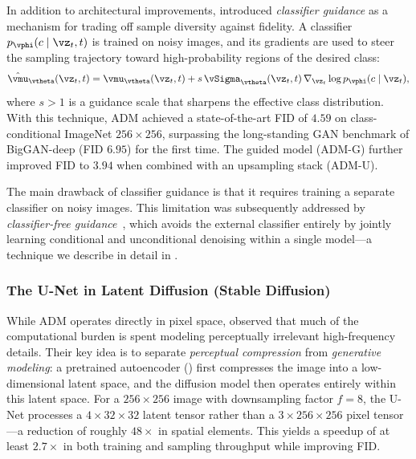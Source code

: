 \documentclass[../../book-main.tex]{subfiles}
\begin{document}
In addition to architectural improvements, \citet{dhariwal2021diffusion} introduced \textit{classifier guidance} as a mechanism for trading off sample diversity against fidelity.
A classifier \(p_{\vphi}(c \mid \vz_t, t)\) is trained on noisy images, and its gradients are used to steer the sampling trajectory toward high-probability regions of the desired class:
\begin{equation}
    \hat{\vmu}_{\vtheta}(\vz_t, t) = \vmu_{\vtheta}(\vz_t, t) + s \, \vSigma_{\vtheta}(\vz_t, t) \, \nabla_{\vz_t} \log p_{\vphi}(c \mid \vz_t) ,
\end{equation}
where \(s > 1\) is a guidance scale that sharpens the effective class distribution.
With this technique, ADM achieved a state-of-the-art FID of \(4.59\) on class-conditional ImageNet \(256 \times 256\), surpassing the long-standing GAN benchmark of BigGAN-deep (FID \(6.95\)) for the first time.
The guided model (ADM-G) further improved FID to \(3.94\) when combined with an upsampling stack (ADM-U).

The main drawback of classifier guidance is that it requires training a separate classifier on noisy images.
This limitation was subsequently addressed by \textit{classifier-free guidance}~\citep{ho2022classifier}, which avoids the external classifier entirely by jointly learning conditional and unconditional denoising within a single model---a technique we describe in detail in .

\subsubsection{The U-Net in Latent Diffusion (Stable Diffusion)}
\label{sec:unet-ldm}

While ADM operates directly in pixel space, \citet{rombach2022high} observed that much of the computational burden is spent modeling perceptually irrelevant high-frequency details.
Their key idea is to separate \textit{perceptual compression} from \textit{generative modeling}: a pretrained autoencoder () first compresses the image into a low-dimensional latent space, and the diffusion model then operates entirely within this latent space.
For a \(256 \times 256\) image with downsampling factor \(f = 8\), the U-Net processes a \(4 \times 32 \times 32\) latent tensor rather than a \(3 \times 256 \times 256\) pixel tensor---a reduction of roughly \(48\times\) in spatial elements.
This yields a speedup of at least \(2.7\times\) in both training and sampling throughput while improving FID.
\end{document}
